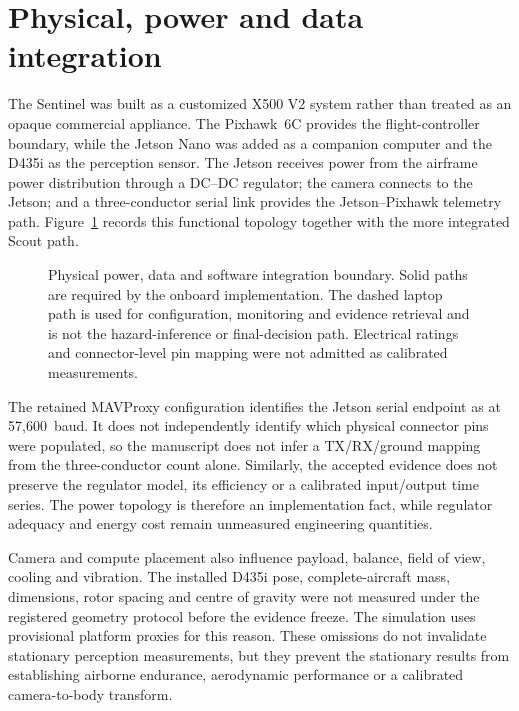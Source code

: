 \section{Physical, power and data integration}
\label{sec:implementation:physical}

The Sentinel was built as a customized X500 V2 system rather than treated as
an opaque commercial appliance. The Pixhawk~6C provides the flight-controller
boundary, while the Jetson Nano was added as a companion computer and the D435i
as the perception sensor. The Jetson receives power from the airframe power
distribution through a DC--DC regulator; the camera connects to the Jetson;
and a three-conductor serial link provides the Jetson--Pixhawk telemetry path.
Figure~\ref{fig:onboard-integration} records this functional topology together
with the more integrated Scout path.

\begin{figure}[p]
  \centering
  \resizebox{0.96\textwidth}{!}{}
  \caption[Physical and software integration boundary.]{Physical power, data
  and software integration boundary. Solid paths are required by the onboard
  implementation. The dashed laptop path is used for configuration, monitoring
  and evidence retrieval and is not the hazard-inference or final-decision
  path. Electrical ratings and connector-level pin mapping were not admitted as
  calibrated measurements.}
  \label{fig:onboard-integration}
\end{figure}

The retained MAVProxy configuration identifies the Jetson serial endpoint as
 at 57,600~baud. It does not independently identify which
physical connector pins were populated, so the manuscript does not infer a
TX/RX/ground mapping from the three-conductor count alone. Similarly, the
accepted evidence does not preserve the regulator model, its efficiency or a
calibrated input/output time series. The power topology is therefore an
implementation fact, while regulator adequacy and energy cost remain
unmeasured engineering quantities.

Camera and compute placement also influence payload, balance, field of view,
cooling and vibration. The installed D435i pose, complete-aircraft mass,
dimensions, rotor spacing and centre of gravity were not measured under the
registered geometry protocol before the evidence freeze. The simulation uses
provisional platform proxies for this reason. These omissions do not invalidate
stationary perception measurements, but they prevent the stationary results
from establishing airborne endurance, aerodynamic performance or a calibrated
camera-to-body transform.

